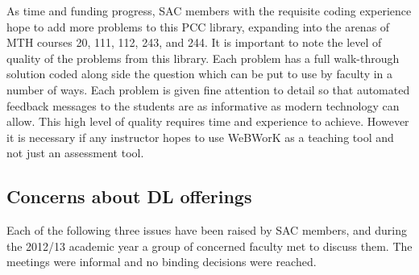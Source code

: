 As time and funding progress, SAC members with the requisite coding experience hope to add more problems to this PCC library, expanding into the arenas of MTH courses 20, 111, 112, 243, and 244. It is important to note the level of quality of the problems from this library. Each problem has a full walk-through solution coded along side the question which can be put to use by faculty in a number of ways. Each problem is given fine attention to detail so that automated feedback messages to the students are as informative as modern technology can allow. This high level of quality requires time and experience to achieve. However it is necessary if any instructor hopes to use WeBWorK as a teaching tool and not just an assessment tool.

\subsection{Concerns about DL offerings}
Each of the following three issues have been raised by SAC members, and during the 2012/13 academic year a group of concerned faculty met to discuss them. The meetings were informal and no binding decisions were reached.
